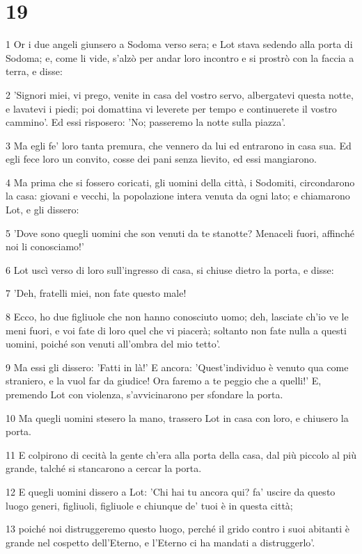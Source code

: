 \chapter{19}

\par 1 Or i due angeli giunsero a Sodoma verso sera; e Lot stava sedendo alla porta di Sodoma; e, come li vide, s'alzò per andar loro incontro e si prostrò con la faccia a terra, e disse:
\par 2 'Signori miei, vi prego, venite in casa del vostro servo, albergatevi questa notte, e lavatevi i piedi; poi domattina vi leverete per tempo e continuerete il vostro cammino'. Ed essi risposero: 'No; passeremo la notte sulla piazza'.
\par 3 Ma egli fe' loro tanta premura, che vennero da lui ed entrarono in casa sua. Ed egli fece loro un convito, cosse dei pani senza lievito, ed essi mangiarono.
\par 4 Ma prima che si fossero coricati, gli uomini della città, i Sodomiti, circondarono la casa: giovani e vecchi, la popolazione intera venuta da ogni lato; e chiamarono Lot, e gli dissero:
\par 5 'Dove sono quegli uomini che son venuti da te stanotte? Menaceli fuori, affinché noi li conosciamo!'
\par 6 Lot uscì verso di loro sull'ingresso di casa, si chiuse dietro la porta, e disse:
\par 7 'Deh, fratelli miei, non fate questo male!
\par 8 Ecco, ho due figliuole che non hanno conosciuto uomo; deh, lasciate ch'io ve le meni fuori, e voi fate di loro quel che vi piacerà; soltanto non fate nulla a questi uomini, poiché son venuti all'ombra del mio tetto'.
\par 9 Ma essi gli dissero: 'Fatti in là!' E ancora: 'Quest'individuo è venuto qua come straniero, e la vuol far da giudice! Ora faremo a te peggio che a quelli!' E, premendo Lot con violenza, s'avvicinarono per sfondare la porta.
\par 10 Ma quegli uomini stesero la mano, trassero Lot in casa con loro, e chiusero la porta.
\par 11 E colpirono di cecità la gente ch'era alla porta della casa, dal più piccolo al più grande, talché si stancarono a cercar la porta.
\par 12 E quegli uomini dissero a Lot: 'Chi hai tu ancora qui? fa' uscire da questo luogo generi, figliuoli, figliuole e chiunque de' tuoi è in questa città;
\par 13 poiché noi distruggeremo questo luogo, perché il grido contro i suoi abitanti è grande nel cospetto dell'Eterno, e l'Eterno ci ha mandati a distruggerlo'.
